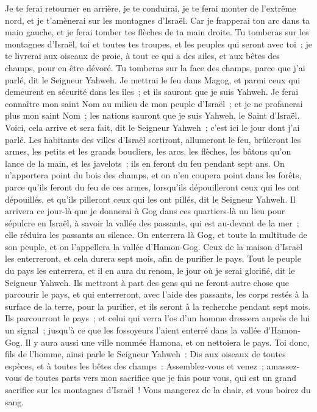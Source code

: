 \begin{multicols}{2}
Je te ferai retourner en arrière, je te conduirai, je te ferai monter de l'extrême nord, et je t'amènerai sur les montagnes d'Israël.
Car je frapperai ton arc dans ta main gauche, et je ferai tomber tes flèches de ta main droite.
Tu tomberas sur les montagnes d'Israël, toi et toutes tes troupes, et les peuples qui seront avec toi~; je te livrerai aux oiseaux de proie, à tout ce qui a des ailes, et aux bêtes des champs, pour en être dévoré.
Tu tomberas sur la face des champs, parce que j'ai parlé, dit le Seigneur Yahweh.
Je mettrai le feu dans Magog, et parmi ceux qui demeurent en sécurité dans les îles~; et ils sauront que je suis Yahweh.
Je ferai connaître mon saint Nom au milieu de mon peuple d'Israël~; et je ne profanerai plus mon saint Nom~; les nations sauront que je suis Yahweh, le Saint d'Israël.
Voici, cela arrive et sera fait, dit le Seigneur Yahweh~; c'est ici le jour dont j'ai parlé.
Les habitants des villes d'Israël sortiront, allumeront le feu, brûleront les armes, les petits et les grands boucliers, les arcs, les flèches, les bâtons qu'on lance de la main, et les javelots~; ils en feront du feu pendant sept ans.
On n'apportera point du bois des champs, et on n'en coupera point dans les forêts, parce qu'ils feront du feu de ces armes, lorsqu'ils dépouilleront ceux qui les ont dépouillés, et qu'ils pilleront ceux qui les ont pillés, dit le Seigneur Yahweh.
Il arrivera ce jour-là que je donnerai à Gog dans ces quartiers-là un lieu pour sépulcre en Israël, à savoir la vallée des passants, qui est au-devant de la mer~; elle réduira les passants au silence. On enterrera là Gog, et toute la multitude de son peuple, et on l'appellera la vallée d'Hamon-Gog.
Ceux de la maison d'Israël les enterreront, et cela durera sept mois, afin de purifier le pays.
Tout le peuple du pays les enterrera, et il en aura du renom, le jour où je serai glorifié, dit le Seigneur Yahweh.
Ils mettront à part des gens qui ne feront autre chose que parcourir le pays, et qui enterreront, avec l'aide des passants, les corps restés à la surface de la terre, pour la purifier, et ils seront à la recherche pendant sept mois.
Ils parcourront le pays~; et celui qui verra l'os d'un homme dressera auprès de lui un signal~; jusqu'à ce que les fossoyeurs l'aient enterré dans la vallée d'Hamon-Gog.
Il y aura aussi une ville nommée Hamona, et on nettoiera le pays.
Toi donc, fils de l'homme, ainsi parle le Seigneur Yahweh~: Dis aux oiseaux de toutes espèces, et à toutes les bêtes des champs~: Assemblez-vous et venez~; amassez-vous de toutes parts vers mon sacrifice que je fais pour vous, qui est un grand sacrifice sur les montagnes d'Israël~! Vous mangerez de la chair, et vous boirez du sang.

\end{multicols}
